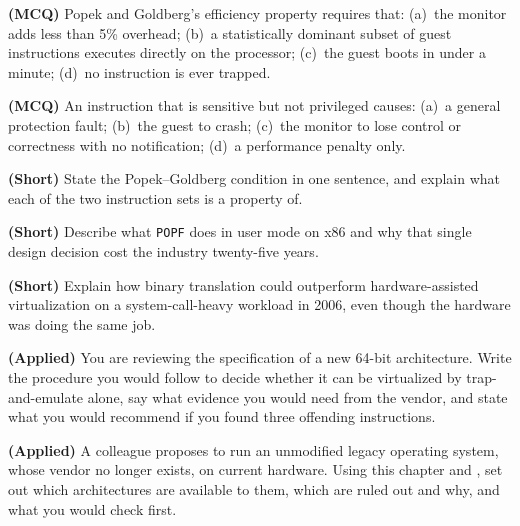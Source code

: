 \begin{reviewq}
  \item \textbf{(MCQ)} Popek and Goldberg's efficiency property requires that:
        (a)~the monitor adds less than 5\% overhead; (b)~a statistically
        dominant subset of guest instructions executes directly on the
        processor; (c)~the guest boots in under a minute; (d)~no instruction is
        ever trapped.
  \item \textbf{(MCQ)} An instruction that is sensitive but not privileged
        causes: (a)~a general protection fault; (b)~the guest to crash;
        (c)~the monitor to lose control or correctness with no notification;
        (d)~a performance penalty only.
  \item \textbf{(Short)} State the Popek--Goldberg condition in one sentence,
        and explain what each of the two instruction sets is a property of.
  \item \textbf{(Short)} Describe what \texttt{POPF} does in user mode on x86
        and why that single design decision cost the industry twenty-five
        years.
  \item \textbf{(Short)} Explain how binary translation could outperform
        hardware-assisted virtualization on a system-call-heavy workload in
        2006, even though the hardware was doing the same job.
  \item \textbf{(Applied)} You are reviewing the specification of a new
        64-bit architecture. Write the procedure you would follow to decide
        whether it can be virtualized by trap-and-emulate alone, say what
        evidence you would need from the vendor, and state what you would
        recommend if you found three offending instructions.
  \item \textbf{(Applied)} A colleague proposes to run an unmodified legacy
        operating system, whose vendor no longer exists, on current hardware.
        Using this chapter and , set out which
        architectures are available to them, which are ruled out and why, and
        what you would check first.
\end{reviewq}
